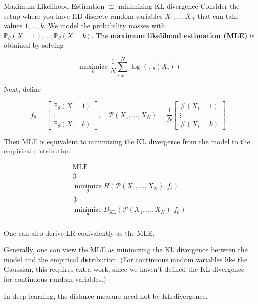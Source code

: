 \begin{frame}[allowframebreaks]

\begin{myconceptblock}{3.16}{Maximum Likelihood Estimation $\cong$ minimizing KL divergence}
    Consider the setup where you have IID discrete random variables $X_{1}, \ldots, X_{N}$ that can take values $1, \ldots, k$. We model the probability masses with $\mathbb{P}_{\theta}(X=1), \ldots, \mathbb{P}_{\theta}(X=k)$. The \textbf{maximum likelihood estimation (MLE)} is obtained by solving

    $$
    \underset{\theta}{\operatorname{maximize}} \frac{1}{N} \sum_{i=1}^{N} \log \left(\mathbb{P}_{\theta}\left(X_{i}\right)\right)
    $$

    Next, define

    $$
    f_{\theta}=\left[\begin{array}{c}
    \mathbb{P}_{\theta}(X=1) \\
    \vdots \\
    \mathbb{P}_{\theta}(X=k)
    \end{array}\right], \quad \mathcal{P}\left(X_{1}, \ldots, X_{N}\right)=\frac{1}{N}\left[\begin{array}{c}
    \#\left(X_{i}=1\right) \\
    \vdots \\
    \#\left(X_{i}=k\right)
    \end{array}\right] .
    $$

    Then MLE is equivalent to minimizing the KL divergence from the model to the empirical distribution.

    $$
    \begin{gathered}
    \text{MLE} \\
    \mathbb{\Updownarrow} \\
    \underset{\theta}{\operatorname{minimize}} H \left( \mathcal{P}\left(X_{1}, \ldots, X_{N}\right), f_{\theta}\right) \\
    \mathbb{\Updownarrow} \\
    \underset{\theta}{\operatorname{minimize}} D_{\mathrm{KL}} \left( \mathcal{P}\left(X_{1}, \ldots, X_{N}\right), f_{\theta}\right) \\
    \end{gathered}
    $$

    One can also derive LR equivalently as the MLE.

    Generally, one can view the MLE as minimizing the KL divergence between the model and the empirical distribution. (For continuous random variables like the Gaussian, this requires extra work, since we haven't defined the KL divergence for continuous random variables.)

    In deep learning, the distance measure need not be KL divergence.
\end{myconceptblock}

\end{frame}

